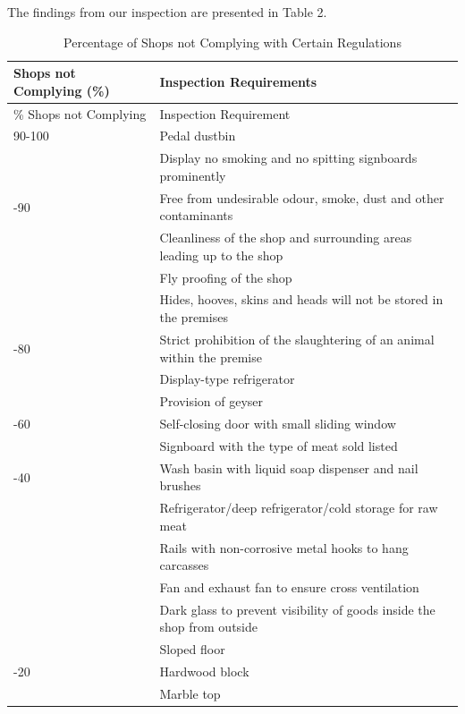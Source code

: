\documentclass[a4paper, 12pt, twoside]{article}
\newcommand\tabitem{\makebox[1em][r]{\textbullet~}}
\begin{document}
The findings from our inspection are presented in Table 2. \\

\footnotesize
\begin{longtable}[l]{>{\centering}p{2.8cm}>{\raggedright\arraybackslash}p{12cm}}
\caption{Percentage of Shops not Complying with Certain Regulations} \\ 
\toprule
Shops not Complying (\%) & Inspection Requirements \\
\midrule
\endfirsthead
\% Shops not Complying & Inspection Requirement \\
\toprule
\endhead
\endfoot
\hline
\endlastfoot

90-100 & \tabitem Pedal dustbin \\
 & \tabitem Display no smoking and no spitting signboards prominently \\
 \midrule
80-90 & \tabitem Free from undesirable odour, smoke, dust and other contaminants \\
 &  \tabitem Cleanliness of the shop and surrounding areas leading up to the shop \\
 & \tabitem Fly proofing of the shop \\
 & \tabitem Hides, hooves, skins and heads will not be stored in the premises \\
\midrule
60-80 & \tabitem Strict prohibition of the slaughtering of an animal within the premise \\
 & \tabitem Display-type refrigerator \\
 & \tabitem Provision of geyser \\
\midrule
40-60 & \tabitem Self-closing door with small sliding window \\
 & \tabitem Signboard with the type of meat sold listed \\
\midrule
20-40 & \tabitem Wash basin with liquid soap dispenser and nail brushes \\
 & \tabitem Refrigerator/deep refrigerator/cold storage for raw meat \\
 & \tabitem Rails with non-corrosive metal hooks to hang carcasses \\
 & \tabitem Fan and exhaust fan to ensure cross ventilation \\
 & \tabitem Dark glass to prevent visibility of goods inside the shop from outside \\
 & \tabitem Sloped floor \\
\midrule
0-20 & \tabitem Hardwood block \\
 & \tabitem Marble top \\

\end{longtable}
\normalsize
\end{document}

